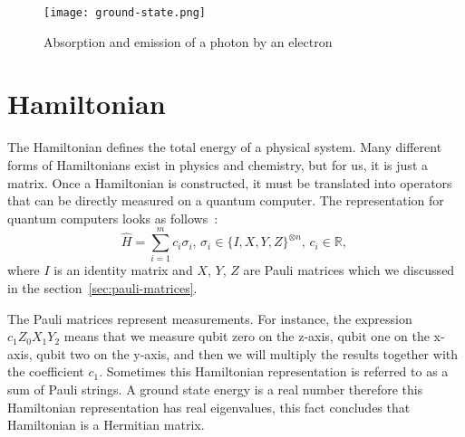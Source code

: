 
\begin{figure}[H]
    \centering
    \texttt{[image: ground-state.png]}
    \caption{Absorption and emission of a photon by an electron~\cite{img:ground-state}}
\end{figure}

\section{Hamiltonian}
The Hamiltonian defines the total energy of a physical system. Many different forms of Hamiltonians exist in physics and chemistry, but for us, it is just a matrix. Once a Hamiltonian is constructed, it must be translated into operators that can be directly measured on a quantum computer. The representation for quantum computers looks as follows~\cite{vqe_method}:
\begin{equation*}
\hat{H} = \sum_{i=1}^{m}c_i\sigma_i \text{, } \sigma_i \in \{I, X, Y, Z\}^{\otimes n}\text{, } c_i \in \mathbb{R} \text{, }
\end{equation*}
where $I$ is an identity matrix and $X$, $Y$, $Z$ are Pauli matrices which we discussed in the section~\ref{sec:pauli-matrices}.

The Pauli matrices represent measurements. For instance, the expression $c_{1}Z_{0}X_{1}Y_{2}$ means that we measure qubit zero on the z-axis, qubit one on the x-axis, qubit two on the y-axis, and then we will multiply the results together with the coefficient $c_{1}$. Sometimes this Hamiltonian representation is referred to as a sum of Pauli strings. A ground state energy is a real number therefore this Hamiltonian representation has real eigenvalues, this fact concludes that Hamiltonian is a Hermitian matrix.
